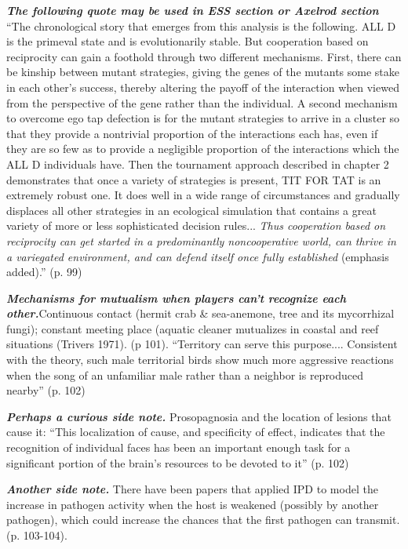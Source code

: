\textit{\textbf{The following quote may be used in ESS section or Axelrod section}} ``The chronological story that emerges from this analysis is the following. ALL D is the primeval state and is evolutionarily stable. But cooperation based on reciprocity can gain a foothold through two different mechanisms. First, there can be kinship between mutant strategies, giving the genes of the mutants some stake in each other's success, thereby altering the payoff of the interaction when viewed from the perspective of the gene rather than the individual. A second mechanism to overcome ego tap defection is for the mutant strategies to arrive in a cluster so that they provide a nontrivial proportion of the interactions each has, even if they are so few as to provide a negligible proportion of the interactions which the ALL D individuals have. Then the tournament approach described in chapter 2 demonstrates that once a variety of strategies is present, TIT FOR TAT is an extremely robust one. It does well in a wide range of circumstances and gradually displaces all other strategies in an ecological simulation that contains a great variety of more or less sophisticated decision rules... \emph{Thus cooperation based on reciprocity can get started in a predominantly noncooperative world, can thrive in a variegated environment, and can defend itself once fully established} (emphasis added).'' (p. 99)

\textit{\textbf{Mechanisms for mutualism when players can't recognize each other.}}Continuous contact (hermit crab \& sea-anemone, tree and its mycorrhizal fungi); constant meeting place (aquatic cleaner mutualizes in coastal and reef situations (Trivers 1971). (p 101). ``Territory can serve this purpose.... Consistent with the theory, such male territorial birds show much more aggressive reactions when the song of an unfamiliar male rather than a neighbor is reproduced nearby'' (p. 102)

\textit{\textbf{Perhaps a curious side note.}} Prosopagnosia and the location of lesions that cause it: ``This localization of cause, and specificity of effect, indicates that the recognition of individual faces has been an important enough task for a significant portion of the brain's resources to be devoted to it'' (p. 102)

\textit{\textbf{Another side note.}} There have been papers that applied IPD to model the increase in pathogen activity when the host is weakened (possibly by another pathogen), which could increase the chances that the first pathogen can transmit. (p. 103-104).

